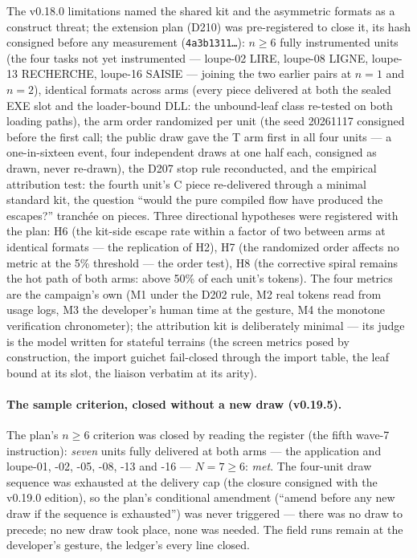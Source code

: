 \documentclass[11pt,a4paper]{article}
\newcommand{\code}[1]{\texttt{\small #1}}
\begin{document}
The v0.18.0 limitations named the shared kit and the asymmetric formats
as a construct threat; the extension plan (D210) was pre-registered to
close it, its hash consigned before any measurement
(\code{4a3b1311\ldots}): $n\ge6$ fully instrumented units (the four
tasks not yet instrumented --- loupe-02 LIRE, loupe-08 LIGNE, loupe-13
RECHERCHE, loupe-16 SAISIE --- joining the two earlier pairs at
$n{=}1$ and $n{=}2$), identical formats across arms (every piece
delivered at both the sealed EXE slot and the loader-bound DLL: the
unbound-leaf class re-tested on both loading paths), the arm order
randomized per unit (the seed 20261117 consigned before the first
call; the public draw gave the T arm first in all four units --- a
one-in-sixteen event, four independent draws at one half each,
consigned as drawn, never re-drawn), the D207 stop
rule reconducted, and the empirical attribution test: the fourth
unit's C piece re-delivered through a minimal standard kit, the
question ``would the pure compiled flow have produced the escapes?''
tranch\'ee on pieces. Three directional hypotheses were registered
with the plan: H6 (the kit-side escape rate within a factor of two
between arms at identical formats --- the replication of H2), H7 (the
randomized order affects no metric at the 5\% threshold --- the order
test), H8 (the corrective spiral remains the hot path of both arms:
above 50\% of each unit's tokens). The four metrics are the
campaign's own (M1 under the D202 rule, M2 real tokens read from
usage logs, M3 the developer's human time at the gesture, M4 the
monotone verification chronometer); the attribution kit is deliberately
minimal --- its judge is the model written for stateful terrains (the
screen metrics posed by construction, the import guichet fail-closed
through the import table, the leaf bound at its slot, the liaison
verbatim at its arity).

\paragraph{The sample criterion, closed without a new draw (v0.19.5).}
The plan's $n\ge6$ criterion was closed by reading the register (the
fifth wave-7 instruction): \emph{seven} units fully delivered at both
arms --- the application and loupe-01, -02, -05, -08, -13 and -16 ---
$N{=}7\ge6$: \emph{met}. The four-unit draw sequence was exhausted
at the delivery cap (the closure consigned with the v0.19.0 edition),
so the plan's conditional amendment (``amend before any new draw if
the sequence is exhausted'') was never triggered --- there was no draw
to precede; no new draw took place, none was needed. The field runs
remain at the developer's gesture, the ledger's every line closed.
\end{document}
